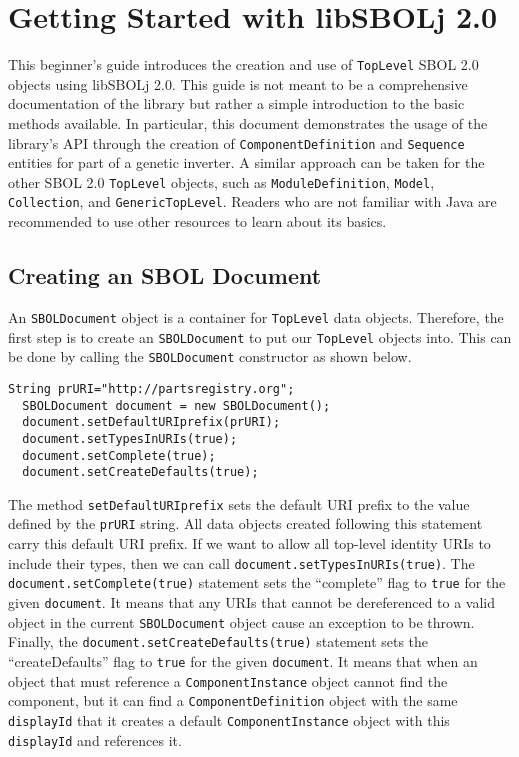 \section*{Getting Started with libSBOLj 2.0}

This beginner's guide introduces the creation and use of \lstinline+TopLevel+ SBOL 2.0 objects using libSBOLj 2.0.  This guide is not meant to be a comprehensive documentation of the library but rather a simple introduction to the basic methods available.  In particular, this document demonstrates
the usage of the library's API through the creation of \lstinline+ComponentDefinition+ and \lstinline+Sequence+ entities for part of a genetic inverter.  A similar approach can be taken for the other SBOL 2.0 \lstinline+TopLevel+ objects, such as \lstinline+ModuleDefinition+, \lstinline+Model+, \lstinline+Collection+, and \lstinline+GenericTopLevel+.  Readers who are not familiar with Java are recommended to use other resources to learn about its basics. 

\subsection*{Creating an SBOL Document}

An \lstinline+SBOLDocument+ object is a container for \lstinline+TopLevel+ data objects.  Therefore, the first step is to create an \lstinline+SBOLDocument+ to put our \lstinline+TopLevel+ objects into.
This can be done by calling the \lstinline+SBOLDocument+ constructor as shown below. 

\begin{minipage}{0.95\textwidth} 
\begin{lstlisting}[basicstyle=\footnotesize\ttfamily]
  String prURI="http://partsregistry.org"; 
  SBOLDocument document = new SBOLDocument();		
  document.setDefaultURIprefix(prURI);
  document.setTypesInURIs(true);
  document.setComplete(true);
  document.setCreateDefaults(true);
\end{lstlisting}
\end{minipage}

The method \lstinline+setDefaultURIprefix+ sets the
default URI prefix to the value defined by the \lstinline+prURI+
string. All data objects created following this statement carry this
default URI prefix. If we want to allow all top-level identity URIs to
include their types, then we can call \lstinline+document.setTypesInURIs(true)+.
The \lstinline+document.setComplete(true)+ statement sets the ``complete'' flag
to \lstinline+true+ for the given \lstinline+document+. It means that
any URIs that cannot be dereferenced to a valid object in the current \lstinline+SBOLDocument+ object cause an exception to be thrown.  Finally, the \lstinline+document.setCreateDefaults(true)+ statement sets the ``createDefaults'' flag to \lstinline+true+ for the given \lstinline+document+.  It means that when an object that must reference a \lstinline+ComponentInstance+ object cannot find the component, but it can find a \lstinline+ComponentDefinition+ object with the same \lstinline+displayId+ that it creates a default \lstinline+ComponentInstance+ object with this \lstinline+displayId+ and references it.

